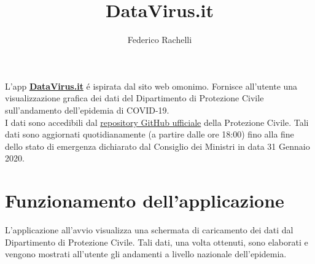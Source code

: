 \documentclass{article}
\begin{document}
    \author{Federico Rachelli}
    \title{\vspace{-2cm}DataVirus.it}
    \maketitle

    L'app \textbf{\href{https://datavirus.it}{DataVirus.it}} é ispirata dal sito web omonimo.
    Fornisce all'utente una visualizzazione grafica dei dati del Dipartimento di Protezione Civile sull'andamento dell'epidemia di COVID-19.
    \\
    I dati sono accedibili dal \href{https://github.com/pcm-dpc/COVID-19}{repository GitHub ufficiale} della Protezione Civile. 
    Tali dati sono aggiornati quotidianamente (a partire dalle ore 18:00) fino alla fine dello stato di emergenza dichiarato dal Consiglio dei Ministri in data 31 Gennaio 2020.
    
    \section{Funzionamento dell'applicazione}
    L'applicazione all'avvio visualizza una schermata di caricamento dei dati dal Dipartimento di Protezione Civile. 
    Tali dati, una volta ottenuti, sono elaborati e vengono mostrati all'utente gli andamenti a livello nazionale dell'epidemia.
    
\end{document}

